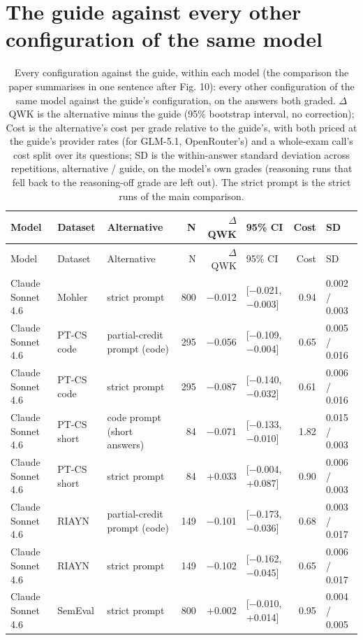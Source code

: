 \documentclass[10pt]{article}
\begin{document}
\section{The guide against every other configuration of the same model}
\begingroup\footnotesize
\begin{longtable}{ll>{\raggedright\arraybackslash}p{3.1cm}rrlrl}
\caption{Every configuration against the guide, within each model (the comparison the paper summarises in one sentence after Fig. 10): every other configuration of the same model against the guide's configuration, on the answers both graded. $\Delta$QWK is the alternative minus the guide (95\% bootstrap interval, no correction); Cost is the alternative's cost per grade relative to the guide's, with both priced at the guide's provider rates (for GLM-5.1, OpenRouter's) and a whole-exam call's cost split over its questions; SD is the within-answer standard deviation across repetitions, alternative / guide, on the model's own grades (reasoning runs that fell back to the reasoning-off grade are left out). The strict prompt is the strict runs of the main comparison.}\\
\hline
Model & Dataset & Alternative & N & $\Delta$QWK & 95\% CI & Cost & SD \\ \hline
\endfirsthead
\hline
Model & Dataset & Alternative & N & $\Delta$QWK & 95\% CI & Cost & SD \\ \hline
\endhead
Claude Sonnet 4.6 & Mohler & strict prompt & 800 & $-$0.012 & [$-$0.021, $-$0.003] & 0.94 & 0.002 / 0.003 \\
Claude Sonnet 4.6 & PT-CS code & partial-credit prompt (code) & 295 & $-$0.056 & [$-$0.109, $-$0.004] & 0.65 & 0.005 / 0.016 \\
Claude Sonnet 4.6 & PT-CS code & strict prompt & 295 & $-$0.087 & [$-$0.140, $-$0.032] & 0.61 & 0.006 / 0.016 \\
Claude Sonnet 4.6 & PT-CS short & code prompt (short answers) & 84 & $-$0.071 & [$-$0.133, $-$0.010] & 1.82 & 0.015 / 0.003 \\
Claude Sonnet 4.6 & PT-CS short & strict prompt & 84 & +0.033 & [$-$0.004, +0.087] & 0.90 & 0.006 / 0.003 \\
Claude Sonnet 4.6 & RIAYN & partial-credit prompt (code) & 149 & $-$0.101 & [$-$0.173, $-$0.036] & 0.68 & 0.003 / 0.017 \\
Claude Sonnet 4.6 & RIAYN & strict prompt & 149 & $-$0.102 & [$-$0.162, $-$0.045] & 0.65 & 0.006 / 0.017 \\
Claude Sonnet 4.6 & SemEval & strict prompt & 800 & +0.002 & [$-$0.010, +0.014] & 0.95 & 0.004 / 0.005 \\

\end{longtable}
\end{document}
